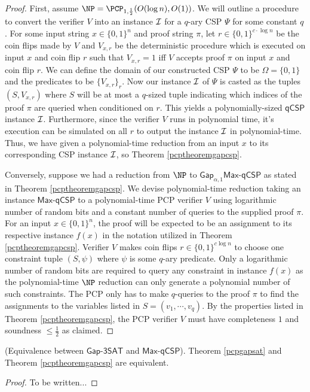 \begin{proof}
First, assume $\NP = \PCP_{1,\frac{1}{2}}(O(\log{n}), O(1))$. We will outline a procedure to convert the verifier $V$ into an instance $\mathcal{I}$ for a $q$-ary CSP $\Psi$ for some constant $q$. For some input string $x \in \{0,1\}^n$ and proof string $\pi$, let $r \in \{0,1\}^{c \cdot \log{n}}$ be the coin flips made by $V$ and $V_{x,r}$ be the deterministic procedure which is executed on input $x$ and coin flip $r$ such that $V_{x,r} = 1$ iff $V$ accepts proof $\pi$ on input $x$ and coin flip $r$. We can define the domain of our constructed CSP $\Psi$ to be $\Omega=\{0,1\}$ and the predicates to be $\{V_{x,r}\}_{r}$. Now our instance $\mathcal{I}$ of $\Psi$ is casted as the tuples $(S, V_{x,r})$ where $S$ will be at most a $q$-sized tuple indicating which indices of the proof $\pi$ are queried when conditioned on $r$. This yields a polynomially-sized $\mathsf{qCSP}$ instance $\mathcal{I}$. Furthermore, since the verifier $V$ runs in polynomial time, it's execution can be simulated on all $r$ to output the instance $\mathcal{I}$ in polynomial-time. Thus, we have given a polynomial-time reduction from an input $x$ to its corresponding CSP instance $\mathcal{I}$, so Theorem \ref{pcptheoremgapcsp}. \newline

Conversely, suppose we had a reduction from $\NP$ to $\mathsf{Gap}_{\alpha,1}\mathsf{Max}$-$\mathsf{qCSP}$ as stated in Theorem \ref{pcptheoremgapcsp}. We devise polynomial-time reduction taking an instance $\mathsf{Max}$-$\mathsf{qCSP}$ to a polynomial-time PCP verifier $V$ using logarithmic number of random bits and a constant number of queries to the supplied proof $\pi$. For an input $x \in \{0,1\}^n$, the proof will be expected to be an assignment to its respective instance $f(x)$ in the notation utilized in Theorem \ref{pcptheoremgapcsp}. Verifier $V$ makes coin flips $r \in \{0,1\}^{c\log{n}}$ to choose one constraint tuple $(S,\psi)$ where $\psi$ is some $q$-ary predicate. Only a logarithmic number of random bits are required to query any constraint in instance $f(x)$ as the polynomial-time $\NP$ reduction can only generate a polynomial number of such constraints.  The PCP only has to make $q$-queries to the proof $\pi$ to find the assignments to the variables listed in $S = (v_1,\cdots,v_q)$. By the properties listed in Theorem \ref{pcptheoremgapcsp}, the PCP verifier $V$ must have completeness $1$ and soundness $\leq \frac{1}{2}$ as claimed.
\end{proof}

\begin{lemma} (Equivalence between $\mathsf{Gap}$-$\mathsf{3SAT}$ and $\mathsf{Max}$-$\mathsf{qCSP}$). Theorem \ref{pcpgapsat} and Theorem \ref{pcptheoremgapcsp} are equivalent.
\end{lemma}
%
\begin{proof}
To be written...
\end{proof}




